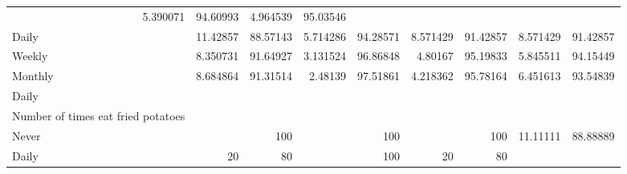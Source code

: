 \documentclass{article}
\begin{document}
\begin{tabular}{lllllllll}
  \multicolumn{1}{r}{5.390071} &
  \multicolumn{1}{r}{94.60993} &
  \multicolumn{1}{r}{4.964539} &
  \multicolumn{1}{r}{95.03546} \\
\multicolumn{1}{l}{\hspace{5em}Daily} &
  \multicolumn{1}{|r}{11.42857} &
  \multicolumn{1}{r}{88.57143} &
  \multicolumn{1}{r}{5.714286} &
  \multicolumn{1}{r}{94.28571} &
  \multicolumn{1}{r}{8.571429} &
  \multicolumn{1}{r}{91.42857} &
  \multicolumn{1}{r}{8.571429} &
  \multicolumn{1}{r}{91.42857} \\
\multicolumn{1}{l}{\hspace{5em}Weekly} &
  \multicolumn{1}{|r}{8.350731} &
  \multicolumn{1}{r}{91.64927} &
  \multicolumn{1}{r}{3.131524} &
  \multicolumn{1}{r}{96.86848} &
  \multicolumn{1}{r}{4.80167} &
  \multicolumn{1}{r}{95.19833} &
  \multicolumn{1}{r}{5.845511} &
  \multicolumn{1}{r}{94.15449} \\
\multicolumn{1}{l}{\hspace{5em}Monthly} &
  \multicolumn{1}{|r}{8.684864} &
  \multicolumn{1}{r}{91.31514} &
  \multicolumn{1}{r}{2.48139} &
  \multicolumn{1}{r}{97.51861} &
  \multicolumn{1}{r}{4.218362} &
  \multicolumn{1}{r}{95.78164} &
  \multicolumn{1}{r}{6.451613} &
  \multicolumn{1}{r}{93.54839} \\
\multicolumn{1}{l}{\hspace{3em}Daily} &
  \multicolumn{1}{|r}{} &
  \multicolumn{1}{r}{} &
  \multicolumn{1}{r}{} &
  \multicolumn{1}{r}{} &
  \multicolumn{1}{r}{} &
  \multicolumn{1}{r}{} &
  \multicolumn{1}{r}{} &
  \multicolumn{1}{r}{} \\
\multicolumn{1}{l}{\hspace{4em}Number of times eat fried potatoes} &
  \multicolumn{1}{|r}{} &
  \multicolumn{1}{r}{} &
  \multicolumn{1}{r}{} &
  \multicolumn{1}{r}{} &
  \multicolumn{1}{r}{} &
  \multicolumn{1}{r}{} &
  \multicolumn{1}{r}{} &
  \multicolumn{1}{r}{} \\
\multicolumn{1}{l}{\hspace{5em}Never} &
  \multicolumn{1}{|r}{} &
  \multicolumn{1}{r}{100} &
  \multicolumn{1}{r}{} &
  \multicolumn{1}{r}{100} &
  \multicolumn{1}{r}{} &
  \multicolumn{1}{r}{100} &
  \multicolumn{1}{r}{11.11111} &
  \multicolumn{1}{r}{88.88889} \\
\multicolumn{1}{l}{\hspace{5em}Daily} &
  \multicolumn{1}{|r}{20} &
  \multicolumn{1}{r}{80} &
  \multicolumn{1}{r}{} &
  \multicolumn{1}{r}{100} &
  \multicolumn{1}{r}{20} &
  \multicolumn{1}{r}{80} &
  \multicolumn{1}{r}{} &

\end{tabular}
\end{document}
